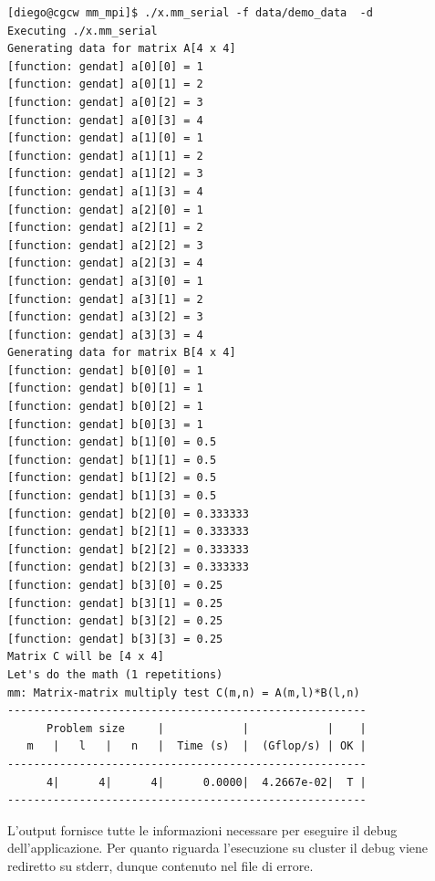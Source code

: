 \begin{lstlisting}
[diego@cgcw mm_mpi]$ ./x.mm_serial -f data/demo_data  -d
Executing ./x.mm_serial
Generating data for matrix A[4 x 4]
[function: gendat] a[0][0] = 1
[function: gendat] a[0][1] = 2
[function: gendat] a[0][2] = 3
[function: gendat] a[0][3] = 4
[function: gendat] a[1][0] = 1
[function: gendat] a[1][1] = 2
[function: gendat] a[1][2] = 3
[function: gendat] a[1][3] = 4
[function: gendat] a[2][0] = 1
[function: gendat] a[2][1] = 2
[function: gendat] a[2][2] = 3
[function: gendat] a[2][3] = 4
[function: gendat] a[3][0] = 1
[function: gendat] a[3][1] = 2
[function: gendat] a[3][2] = 3
[function: gendat] a[3][3] = 4
Generating data for matrix B[4 x 4]
[function: gendat] b[0][0] = 1
[function: gendat] b[0][1] = 1
[function: gendat] b[0][2] = 1
[function: gendat] b[0][3] = 1
[function: gendat] b[1][0] = 0.5
[function: gendat] b[1][1] = 0.5
[function: gendat] b[1][2] = 0.5
[function: gendat] b[1][3] = 0.5
[function: gendat] b[2][0] = 0.333333
[function: gendat] b[2][1] = 0.333333
[function: gendat] b[2][2] = 0.333333
[function: gendat] b[2][3] = 0.333333
[function: gendat] b[3][0] = 0.25
[function: gendat] b[3][1] = 0.25
[function: gendat] b[3][2] = 0.25
[function: gendat] b[3][3] = 0.25
Matrix C will be [4 x 4]
Let's do the math (1 repetitions)
mm: Matrix-matrix multiply test C(m,n) = A(m,l)*B(l,n)
-------------------------------------------------------
      Problem size     |            |            |    |
   m   |   l   |   n   |  Time (s)  |  (Gflop/s) | OK |
-------------------------------------------------------
      4|      4|      4|      0.0000|  4.2667e-02|  T |
-------------------------------------------------------
\end{lstlisting}

L'output fornisce tutte le informazioni necessare per eseguire il debug dell'applicazione.
Per quanto riguarda l'esecuzione su cluster il debug viene rediretto su stderr, dunque contenuto nel file di errore.

